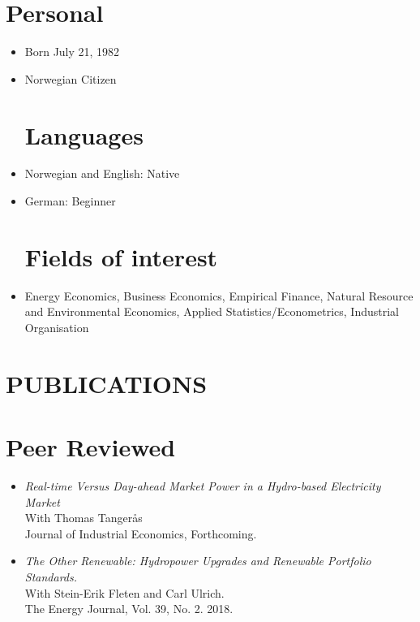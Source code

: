 \documentclass[margin]{res}
\begin{document}

\address{mob:  +47 90 56 64 62 \\ email: johannes.mauritzen@bi.no \\
website:  \url{jmaurit.github.io}}

\begin{resume}
\section{Personal}
\begin{itemize}
\item[] Born July 21, 1982
\item[] Norwegian Citizen

\normalsize{\section{Languages}}
\item[] Norwegian and English: Native
\item[] German: Beginner

\normalsize{\section{Fields of interest}}
\item[] Energy Economics, Business Economics, Empirical Finance, Natural Resource and Environmental Economics, Applied Statistics/Econometrics, Industrial Organisation
\end{itemize}


\section{PUBLICATIONS}

\normalsize{\section{Peer Reviewed}}
\begin{itemize}
\setlength{\itemsep}{10pt}

\item[] \emph{Real-time Versus Day-ahead Market Power in a Hydro-based Electricity Market} \\
With Thomas Tanger\aa s \\
Journal of Industrial Economics, Forthcoming.

\item[] \emph{The Other Renewable: Hydropower Upgrades and Renewable Portfolio Standards.} \\
With Stein-Erik Fleten and Carl Ulrich.\\
The Energy Journal, Vol. 39, No. 2. 2018.


\end{itemize}
\end{resume}
\end{document}
